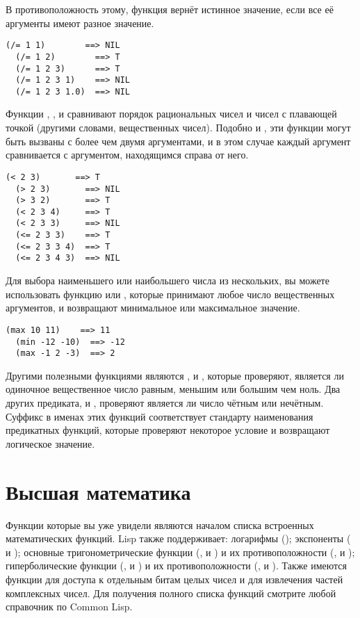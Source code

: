 В противоположность этому, функция \code{/=} вернёт истинное значение, если все её
аргументы имеют разное значение.

\begin{lstlisting}[style=lisprepl]
  (/= 1 1)        ==> NIL
  (/= 1 2)        ==> T
  (/= 1 2 3)      ==> T
  (/= 1 2 3 1)    ==> NIL
  (/= 1 2 3 1.0)  ==> NIL
\end{lstlisting}

Функции \code{<}, \code{>}, \code{<=} и \code{>=} сравнивают порядок рациональных чисел и чисел с
плавающей точкой (другими словами, вещественных чисел).  Подобно \code{=} и \code{/=}, эти
функции могут быть вызваны с более чем двумя аргументами, и в этом случае каждый аргумент
сравнивается с аргументом, находящимся справа от него.

\begin{lstlisting}[style=lisprepl]
  (< 2 3)       ==> T
  (> 2 3)       ==> NIL
  (> 3 2)       ==> T
  (< 2 3 4)     ==> T
  (< 2 3 3)     ==> NIL
  (<= 2 3 3)    ==> T
  (<= 2 3 3 4)  ==> T
  (<= 2 3 4 3)  ==> NIL
\end{lstlisting}

Для выбора наименьшего или наибольшего числа из нескольких, вы можете использовать функцию
 или , которые принимают любое число вещественных аргументов, и
возвращают минимальное или максимальное значение.

\begin{lstlisting}[style=lisprepl]
  (max 10 11)    ==> 11
  (min -12 -10)  ==> -12
  (max -1 2 -3)  ==> 2
\end{lstlisting}

Другими полезными функциями являются ,  и , которые
проверяют, является ли одиночное вещественное число равным, меньшим или большим чем ноль.
Два других предиката,  и , проверяют является ли число чётным или
нечётным.  Суффикс  в именах этих функций соответствует стандарту наименования
предикатных функций, которые проверяют некоторое условие и возвращают логическое значение.

\section{Высшая математика}

Функции которые вы уже увидели являются началом списка встроенных математических
функций. Lisp также поддерживает: логарифмы (); экспоненты ( и
); основные тригонометрические функции (,  и ) и
их противоположности (,  и ); гиперболические функции
(,  и ) и их противоположности (,
 и ).  Также имеются функции для доступа к отдельным битам целых
чисел и для извлечения частей комплексных чисел.  Для получения полного списка функций
смотрите любой справочник по Common Lisp.

